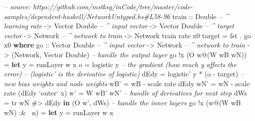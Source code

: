 \documentclass[]{article}
\newenvironment{Shaded}{\begin{snugshade}}{\end{snugshade}}
\newcommand{\CommentTok}[1]{\textcolor[rgb]{0.56,0.35,0.01}{\textit{#1}}}
\newcommand{\DataTypeTok}[1]{\textcolor[rgb]{0.13,0.29,0.53}{#1}}
\newcommand{\FunctionTok}[1]{\textcolor[rgb]{0.00,0.00,0.00}{#1}}
\newcommand{\KeywordTok}[1]{\textcolor[rgb]{0.13,0.29,0.53}{\textbf{#1}}}
\newcommand{\NormalTok}[1]{#1}
\newcommand{\OtherTok}[1]{\textcolor[rgb]{0.56,0.35,0.01}{#1}}
\begin{document}
\begin{Shaded}
\begin{Highlighting}[]
\CommentTok{-- source: https://github.com/mstksg/inCode/tree/master/code-samples/dependent-haskell/NetworkUntyped.hs#L58-96}
\OtherTok{train ::} \DataTypeTok{Double}           \CommentTok{-- ^ learning rate}
      \OtherTok{->} \DataTypeTok{Vector} \DataTypeTok{Double}    \CommentTok{-- ^ input vector}
      \OtherTok{->} \DataTypeTok{Vector} \DataTypeTok{Double}    \CommentTok{-- ^ target vector}
      \OtherTok{->} \DataTypeTok{Network}          \CommentTok{-- ^ network to train}
      \OtherTok{->} \DataTypeTok{Network}
\NormalTok{train rate x0 target }\FunctionTok{=}\NormalTok{ fst }\FunctionTok{.}\NormalTok{ go x0}
  \KeywordTok{where}
\OtherTok{    go ::} \DataTypeTok{Vector} \DataTypeTok{Double}    \CommentTok{-- ^ input vector}
       \OtherTok{->} \DataTypeTok{Network}          \CommentTok{-- ^ network to train}
       \OtherTok{->}\NormalTok{ (}\DataTypeTok{Network}\NormalTok{, }\DataTypeTok{Vector} \DataTypeTok{Double}\NormalTok{)}
    \CommentTok{-- handle the output layer}
\NormalTok{    go }\FunctionTok{!}\NormalTok{x (}\DataTypeTok{O}\NormalTok{ w}\FunctionTok{@}\NormalTok{(}\DataTypeTok{W}\NormalTok{ wB wN))}
        \FunctionTok{=} \KeywordTok{let}\NormalTok{ y    }\FunctionTok{=}\NormalTok{ runLayer w x}
\NormalTok{              o    }\FunctionTok{=}\NormalTok{ logistic y}
              \CommentTok{-- the gradient (how much y affects the error)}
              \CommentTok{--   (logistic' is the derivative of logistic)}
\NormalTok{              dEdy }\FunctionTok{=}\NormalTok{ logistic' y }\FunctionTok{*}\NormalTok{ (o }\FunctionTok{-}\NormalTok{ target)}
              \CommentTok{-- new bias weights and node weights}
\NormalTok{              wB'  }\FunctionTok{=}\NormalTok{ wB }\FunctionTok{-}\NormalTok{ scale rate dEdy}
\NormalTok{              wN'  }\FunctionTok{=}\NormalTok{ wN }\FunctionTok{-}\NormalTok{ scale rate (dEdy }\OtherTok{`outer`}\NormalTok{ x)}
\NormalTok{              w'   }\FunctionTok{=} \DataTypeTok{W}\NormalTok{ wB' wN'}
              \CommentTok{-- bundle of derivatives for next step}
\NormalTok{              dWs  }\FunctionTok{=}\NormalTok{ tr wN }\FunctionTok{#>}\NormalTok{ dEdy}
          \KeywordTok{in}\NormalTok{  (}\DataTypeTok{O}\NormalTok{ w', dWs)}
    \CommentTok{-- handle the inner layers}
\NormalTok{    go }\FunctionTok{!}\NormalTok{x (w}\FunctionTok{@}\NormalTok{(}\DataTypeTok{W}\NormalTok{ wB wN) }\FunctionTok{:&~}\NormalTok{ n)}
        \FunctionTok{=} \KeywordTok{let}\NormalTok{ y          }\FunctionTok{=}\NormalTok{ runLayer w x}

\end{Highlighting}
\end{Shaded}
\end{document}
